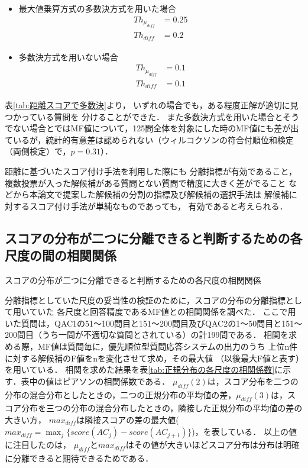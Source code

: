 \documentclass[japanese]{jnlp_1.4}
\begin{document}
\pagebreak

\begin{itemize}
\item 最大値乗算方式の多数決方式を用いた場合
\begin{align}
Th_{\mu_{\mathit{diff}}} & = 0.25 \\
Th_{\mathit{diff}} & = 0.2
\end{align}
\item 多数決方式を用いない場合
\begin{align}
Th_{\mu_{\mathit{diff}}} & = 0.1 \\
Th_{\mathit{diff}} & = 0.1
\end{align}
\end{itemize}

表\ref{tab:距離スコアで多数決}より，
いずれの場合でも，ある程度正解が適切に見つかっている質問を
分けることができた．
また多数決方式を用いた場合とそうでない場合とではMF値について，125問全体を対象にした時のMF値にも差が出ているが，統計的有意差は認められない（ウィルコクソンの符合付順位和検定（両側検定）で，$p=0.31$）．

距離に基づいたスコア付け手法を利用した際にも
分離指標が有効であること，
複数投票が入った解候補がある質問とない質問で精度に大きく差がでること
などから本論文で提案した解候補の分割の指標及び解候補の選択手法は
解候補に対するスコア付け手法が単純なものであっても，
有効であると考えられる．


\subsection{スコアの分布が二つに分離できると判断するための各尺度の間の相関関係}\label{sec:相関}

\begin{table}[b]
\vspace{-0.5\baselineskip}
\caption{スコアの分布が二つに分離できると判断するための各尺度の相関関係}
\label{tab:正規分布の各尺度の相関係数}
\begin{center}

\end{center}
\end{table}

分離指標としていた尺度の妥当性の検証のために，スコアの分布の分離指標として用いていた
各尺度と回答精度であるMF値との相関関係を調べた．
ここで用いた質問は，QAC1の51〜100問目と151〜200問目及びQAC2の1〜50問目と151〜200問目（うち一問が不適切な質問とされている）の計199問である．
相関を求める際，MF値は質問毎に，優先順位型質問応答システムの出力のうち
上位n件に対する解候補のF値をnを変化させて求め，その最大値
（以後最大F値と表す）を用いている．
相関を求めた結果を表\ref{tab:正規分布の各尺度の相関係数}に示す．表中の値はピアソンの相関係数である．
$\mu_{\mathit{diff}}(2)$は，スコア分布を二つの分布の混合分布としたときの，二つの正規分布の平均値の差，$\mu_{\mathit{diff}}(3)$は，スコア分布を三つの分布の混合分布したときの，隣接した正規分布の平均値の差の大きい方，
$max_{\mathit{diff}}$は隣接スコアの差の最大値($max_{\mathit{diff}}=\max_j \{score(AC_j)-score(AC_{j+1})\}$)，を表している．
以上の値に注目したのは，
$\mu_{\mathit{diff}}$と$max_{\mathit{diff}}$はその値が大きいほどスコア分布は分布は明確に分離できると期待できるためである．
\end{document}
